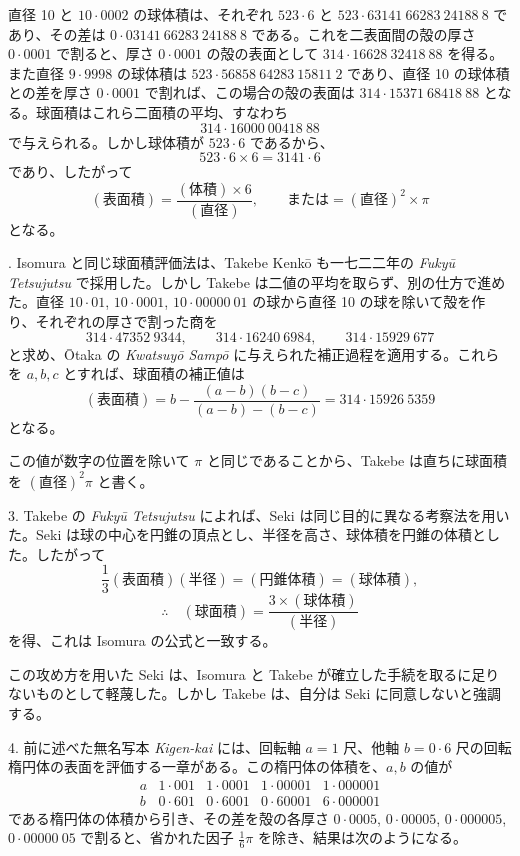 \documentclass[11pt]{article}
\newcommand{\scanpage}[2]{\clearpage\setcounter{footnote}{0}\noindent{\footnotesize\color{gray}PDF #1 頁 · #2}\par\medskip}
\newcommand{\scanfooter}{}
\begin{document}
直径 10 と $10\cdot0002$ の球体積は、それぞれ $523\cdot6$ と $523\cdot63141\ 66283\ 24188\ 8$ であり、その差は $0\cdot03141\ 66283\ 24188\ 8$ である。これを二表面間の殻の厚さ $0\cdot0001$ で割ると、厚さ $0\cdot0001$ の殻の表面として $314\cdot16628\ 32418\ 88$ を得る。また直径 $9\cdot9998$ の球体積は $523\cdot56858\ 64283\ 15811\ 2$ であり、直径 10 の球体積との差を厚さ $0\cdot0001$ で割れば、この場合の殻の表面は $314\cdot15371\ 68418\ 88$ となる。球面積はこれら二面積の平均、すなわち
\[
314\cdot16000\ 00418\ 88
\]
で与えられる。しかし球体積が $523\cdot6$ であるから、
\[
523\cdot6\times6=3141\cdot6
\]
であり、したがって
\[
(\text{表面積})=\frac{(\text{体積})\times6}{(\text{直径})},\qquad\text{または}= (\text{直径})^2\times\pi
\]
となる。
\scanfooter

\scanpage{0221}{第27章、印刷頁207}
2. Isomura と同じ球面積評価法は、Takebe Kenkō も一七二二年の \emph{Fukyū Tetsujutsu} で採用した。しかし Takebe は二値の平均を取らず、別の仕方で進めた。直径 $10\cdot01$, $10\cdot0001$, $10\cdot00000\ 01$ の球から直径 10 の球を除いて殻を作り、それぞれの厚さで割った商を
\[
314\cdot47352\ 9344,\qquad 314\cdot16240\ 6984,\qquad 314\cdot15929\ 677
\]
と求め、Ōtaka の \emph{Kwatsuyō Sampō} に与えられた補正過程を適用する。これらを $a,b,c$ とすれば、球面積の補正値は
\[
(\text{表面積})=b-\frac{(a-b)(b-c)}{(a-b)-(b-c)}=314\cdot15926\ 5359
\]
となる。

この値が数字の位置を除いて $\pi$ と同じであることから、Takebe は直ちに球面積を $(\text{直径})^2\pi$ と書く。

3. Takebe の \emph{Fukyū Tetsujutsu} によれば、Seki は同じ目的に異なる考察法を用いた。Seki は球の中心を円錐の頂点とし、半径を高さ、球体積を円錐の体積とした。したがって
\[
\frac13(\text{表面積})(\text{半径})=(\text{円錐体積})=(\text{球体積}),
\]
\[
\therefore\quad (\text{球面積})=\frac{3\times(\text{球体積})}{(\text{半径})}
\]
を得、これは Isomura の公式と一致する。

この攻め方を用いた Seki は、Isomura と Takebe が確立した手続を取るに足りないものとして軽蔑した。しかし Takebe は、自分は Seki に同意しないと強調する。

4. 前に述べた無名写本 \emph{Kigen-kai} には、回転軸 $a=1$ 尺、他軸 $b=0\cdot6$ 尺の回転楕円体の表面を評価する一章がある。この楕円体の体積を、$a,b$ の値が
\[
\begin{array}{c|c|c|c|c}
a&1\cdot001&1\cdot0001&1\cdot00001&1\cdot000001\\
b&0\cdot601&0\cdot6001&0\cdot60001&6\cdot000001
\end{array}
\]
である楕円体の体積から引き、その差を殻の各厚さ $0\cdot0005$, $0\cdot00005$, $0\cdot000005$, $0\cdot00000\ 05$ で割ると、省かれた因子 $\frac16\pi$ を除き、結果は次のようになる。
\scanfooter
\end{document}
